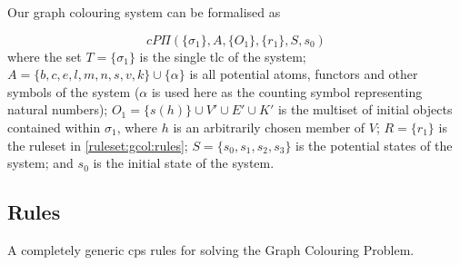 Our graph colouring system can be formalised as

\[
cP\Pi(\{\sigma_1\}, A, \{O_1\}, \{r_1\}, S, s_0)
\] where the set \(T = \{\sigma_1\}\) is the single \gls{tlc} of the system; \(A = \{b, c, e,\allowbreak l,\allowbreak m,\allowbreak n, s, v, k\} \allowbreak \cup \{\alpha\}\) is all potential atoms, functors and other symbols of the system (\(\alpha\) is used here as the counting symbol representing natural numbers); \(O_1 = \{s(h)\} \cup V' \allowbreak \cup E' \allowbreak \cup K'\) is the multiset of initial objects contained within \(\sigma_1\), where \(h\) is an arbitrarily chosen member of \(V\); \(R = \{r_1\}\) is the ruleset in \autoref{ruleset:gcol:rules}; \(S = \{s_0, s_1, s_2, s_3\}\) is the potential states of the system; and \(s_0\) is the initial state of the system.



\subsection{\label{sec:gcol:rules}Rules}

\begin{cprulesetfloat}
\begin{cpruleset}

    
    
    
    
    

\end{cpruleset}
\caption[\gls{cps} rules for the Graph Colouring Problem]{\label{ruleset:gcol:rules}A completely generic \gls{cps} rules for solving the Graph Colouring Problem.}
\end{cprulesetfloat}

